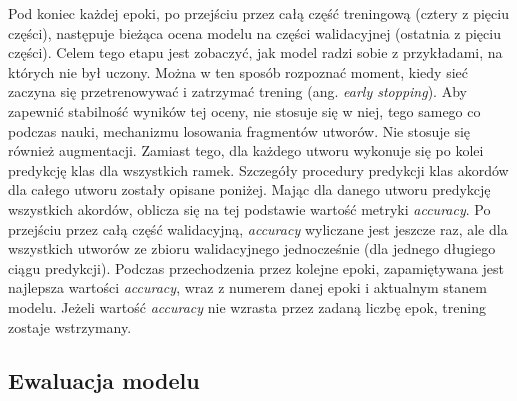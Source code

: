 Pod koniec każdej epoki, po przejściu przez całą część treningową (cztery z pięciu części), następuje bieżąca ocena modelu na części walidacyjnej (ostatnia z pięciu części). Celem tego etapu jest zobaczyć, jak model radzi sobie z przykładami, na których nie był uczony. Można w ten sposób rozpoznać moment, kiedy sieć zaczyna się przetrenowywać i zatrzymać trening (ang. \emph{early stopping}). Aby zapewnić stabilność wyników tej oceny, nie stosuje się w niej, tego samego co podczas nauki, mechanizmu losowania fragmentów utworów. Nie stosuje się również augmentacji. Zamiast tego, dla każdego utworu wykonuje się po kolei predykcję klas dla wszystkich ramek. Szczegóły procedury predykcji klas akordów dla całego utworu zostały opisane poniżej. Mając dla danego utworu predykcję wszystkich akordów, oblicza się na tej podstawie wartość metryki \emph{accuracy}. Po przejściu przez całą część walidacyjną, \emph{accuracy} wyliczane jest jeszcze raz, ale dla wszystkich utworów ze zbioru walidacyjnego jednocześnie (dla jednego długiego ciągu predykcji). Podczas przechodzenia przez kolejne epoki, zapamiętywana jest najlepsza wartości \emph{accuracy}, wraz z numerem danej epoki i aktualnym stanem modelu. Jeżeli wartość \emph{accuracy} nie wzrasta przez zadaną liczbę epok, trening zostaje wstrzymany.

\subsection{Ewaluacja modelu} \label{subsection:model_evaluation}

